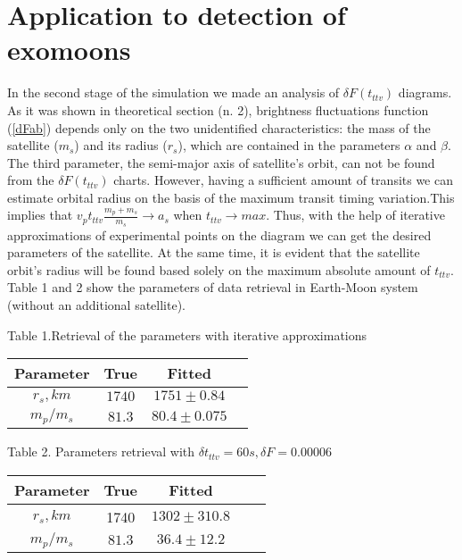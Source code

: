 \documentclass[12pt]{article}
\begin{document}
\section{Application to detection of exomoons}
In the second stage of the simulation we made an analysis of $\delta F(t_{ttv})$ diagrams. As it was shown in theoretical section (n. 2), brightness fluctuations function (\ref{dFab}) depends only on the two unidentified characteristics: the mass of the satellite ($m_s$) and its radius ($r_s$), which are contained in the parameters $\alpha $ and $\beta$. The third parameter, the semi-major axis of satellite's orbit, can not be found from the $\delta F(t_{ttv})$ charts. However, having a sufficient amount of transits we can estimate orbital radius on the basis of the maximum transit timing variation.This implies that 
$v_p t_{ttv} \frac{m_p+m_s}{m_s}\rightarrow a_s$ when $t_{ttv} \rightarrow max$. Thus, with the help of iterative approximations of experimental points on the diagram we can get the desired parameters of the satellite. At the same time, it is evident that the satellite orbit's radius will be found based solely on the maximum absolute amount of $t_{ttv}$.
Table 1 and 2 show the parameters of data retrieval in Earth-Moon system (without an additional satellite).







\begin{table}{Table 1.Retrieval of the parameters with iterative approximations }
\centering
 \begin{tabular}{c c c c} 
  \noalign{\smallskip}
 \hline
 \noalign{\smallskip}
Parameter & True  & Fitted \\ [0.5ex] 
 \hline
$  r_s , km $  & $1740 $    &  $ 1751  \pm 0.84 $ \\
$ m_p/m_s $ & $  81.3 $  & $80.4 \pm 0.075$ \\ [1ex] 
 \hline
 \end{tabular}
\end{table}


\begin{table}{Table 2. Parameters retrieval with $\delta t_{ttv}=60 s, \delta F=0.00006$}
\centering
 \begin{tabular}{c c c c c} 
  \noalign{\smallskip}
 \hline
 \noalign{\smallskip}
Parameter & True & Fitted \\ [0.5ex] 
 \hline
$ r_s , km$  & 1740  & $1302  \pm 310.8$ \\
$ m_p/m_s$ &   $81.3 $ & $ 36.4 \pm 12.2  $ \\  [1ex] 
 \hline
 \end{tabular}
\end{table}
\end{document}
